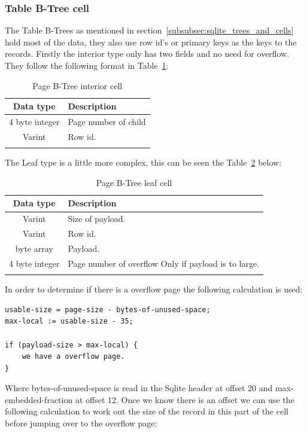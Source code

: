 \subsubsection{Table B-Tree cell}
\label{subsubsec:table_btree_cell}

The Table B-Trees as mentioned in section~\ref{subsubsec:sqlite_trees_and_cells} hold most of the data, they also use row id's or primary keys as the keys to the records. Firstly the interior type only has two fields and no need for overflow. They follow the following format in Table~\ref{tbl:table_btree_cell_interior}: 

\begin{longtable}[h]{| c | p{5cm} |}
		\hline
			\textbf{Data type} & \textbf{Description} \\ 
		\hline
		\endhead
			4 byte integer & Page number of child \\
		\hline
			Varint & Row id. \\
		\hline
	\caption{Page B-Tree interior cell}
	\label{tbl:table_btree_cell_interior}
\end{longtable}

The Leaf type is a little more complex, this can be seen the Table~\ref{tbl:table_btree_cell_leaf} below:

\begin{longtable}[h]{| c | p{5cm} |}
		\hline
			\textbf{Data type} & \textbf{Description} \\ 
		\hline
		\endhead
			Varint & Size of payload. \\
		\hline
			Varint & Row id. \\
		\hline
			byte array & Payload. \\
		\hline
			4 byte integer & Page number of overflow \newline
							  Only if payload is to large.\\
		\hline
	\caption{Page B-Tree leaf cell}
	\label{tbl:table_btree_cell_leaf}
\end{longtable}

In order to determine if there is a overflow page the following calculation is used:

\begin{lstlisting}	
usable-size = page-size - bytes-of-unused-space;
max-local := usable-size - 35;

if (payload-size > max-local) {
	we have a overflow page.
}
\end{lstlisting}

Where bytes-of-unused-space is read in the Sqlite header at offset 20 and \newline max-embedded-fraction at offset 12. Once we know there is an offset we can use the following calculation to work out the size of the record in this part of the cell before jumping over to the overflow page:  

